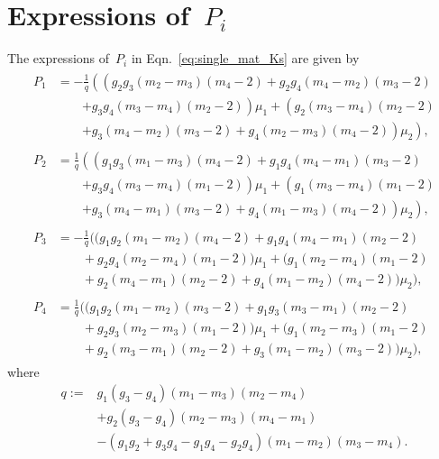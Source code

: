 \documentclass[preprint,10pt,times]{elsarticle}
\numberwithin{equation}{section}
\renewcommand{\>}{$\Rightarrow$}
\begin{document}
\section{Expressions of~$P_i$}
\label{Appen:Pi}
The expressions of~$P_i$ in Eqn.~\eqref{eq:single_mat_Ks} are given by
\begin{subequations}
\begin{align}
	\begin{split}
	P_1 & = -\frac{1}{q} \left(\left(g_2 g_3 (m_2 - m_3)(m_4 -2) + g_2 g_4 (m_4 - m_2)(m_3 - 2) \right.\right.\\
	&\qquad{} \left. + g_3 g_4 (m_3 - m_4)(m_2 -2) \right) \mu_1  + \left(g_2 (m_3 - m_4)(m_2 -2) \right. \\
	&\qquad{} \left.\left. + g_3(m_4 - m_2)(m_3 -2) + g_4 (m_2 - m_3)(m_4 -2) \right)\mu_2 \right) ,
	\end{split} \\
	\begin{split}
	P_2 & = \frac{1}{q} \left(\left( g_1 g_3 (m_1 - m_3)(m_4 -2) + g_1 g_4 (m_4 - m_1)(m_3 - 2)\right.\right. \\
	&\qquad{} \left. + g_3 g_4 (m_3 - m_4)(m_1 -2)  \right) \mu_1 + \left(g_1 (m_3 - m_4)(m_1 -2) \right.\\
	&\qquad{} \left.\left. + g_3(m_4 - m_1)(m_3 -2) + g_4 (m_1 - m_3)(m_4 -2)  \right)\mu_2  \right),
	\end{split} \\
	\begin{split}
	P_3 & = -\frac{1}{q} ((g_1 g_2 (m_1 - m_2)(m_4 -2) + g_1 g_4 (m_4 - m_1)(m_2 - 2) \\ &\qquad{} + g_2 g_4 (m_2 - m_4)(m_1 -2) ) \mu_1 + (g_1 (m_2 - m_4)(m_1 -2) \\  &\qquad{} + g_2(m_4 - m_1)(m_2 -2) + g_4 (m_1 - m_2)(m_4 -2))\mu_2),
	\end{split} \\
	\begin{split}
	P_4 & = \frac{1}{q} ((g_1 g_2 (m_1 - m_2)(m_3 -2) + g_1 g_3 (m_3 - m_1)(m_2 - 2) \\ &\qquad{} + g_2 g_3 (m_2 - m_3)(m_1 -2)) \mu_1 +  (g_1 (m_2 - m_3)(m_1 -2) \\  &\qquad{} + g_2(m_3 - m_1)(m_2 -2) + g_3 (m_1 - m_2)(m_3 -2))\mu_2),
	\end{split}
	\end{align}
\end{subequations}
where
\begin{equation}
	\begin{aligned}
	q := & g_1(g_3 - g_4)(m_1 - m_3)(m_2 - m_4) \\
	 	& + g_2(g_3 - g_4)(m_2 - m_3)(m_4 - m_1) \\
	 	& - (g_1 g_2 + g_3 g_4 - g_1 g_4 - g_2 g_4)(m_1 - m_2)(m_3 - m_4).
	\end{aligned}
\end{equation}
\end{document}
